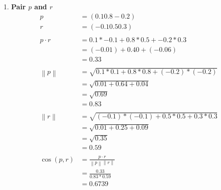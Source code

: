 \documentclass[12pt]{article}%
\begin{document}
\begin{enumerate}
\begin{enumerate}
\begin{enumerate}
			\item \textbf{Pair $p$ and $r$}
			\begin{align*}
				 p & = (0.1 0.8 -0.2) \\ 
				 r & = (-0.1 0.5 0.3) \\ 
				 \\
				 p \cdot r & = 0.1 * -0.1 + 0.8 * 0.5 + -0.2 * 0.3 \\
				 & = (-0.01) + 0.40 + (-0.06) \\
				 & = 0.33\\ 
				 \\
				 \left \| p \right \| & = \sqrt{0.1 * 0.1 + 0.8 * 0.8 + (-0.2)*(-0.2)} \\
				 & = \sqrt{0.01 + 0.64 + 0.04} \\
				 & = \sqrt{0.69} \\
				 & = 0.83\\
				 \\
				 \left \| r \right \| & = \sqrt{(-0.1) * (-0.1) + 0.5 * 0.5 + 0.3*0.3} \\
				 & = \sqrt{0.01 + 0.25 + 0.09} \\ 
				 & = \sqrt{0.35} \\
				 & = 0.59 \\
				 \\
				 \cos (p,r) & = \frac{p\cdot r}{\left \| p \right \| \left \| r \right \|} \\
				 & = \frac{0.33}{0.83 * 0.59} \\
				 & = 0.6739 \\
			\end{align*}


\end{enumerate}
\end{enumerate}
\end{enumerate}
\end{document}
